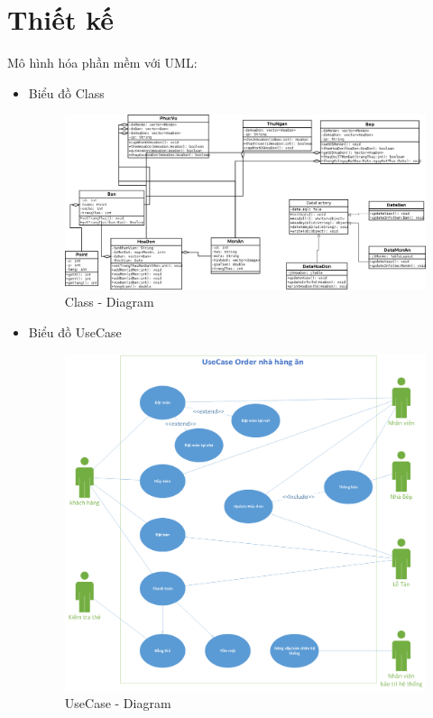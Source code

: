 \documentclass[a4paper,12pt]{report}
\begin{document}
\section{Thiết kế}
Mô hình hóa phần mềm với UML:
\begin{itemize}
	\item Biểu đồ Class\\
	\begin{figure}[h]
		\centering
		\includegraphics[scale=0.3]{UML-Final.png}
		\caption{Class - Diagram}
	\end{figure}
	\item Biểu đồ UseCase\\
	\begin{figure}[h]
		\centering
		\includegraphics[scale=0.2]{UseCase.png}
		\caption{UseCase - Diagram}
	\end{figure}
\end{itemize}
\end{document}
